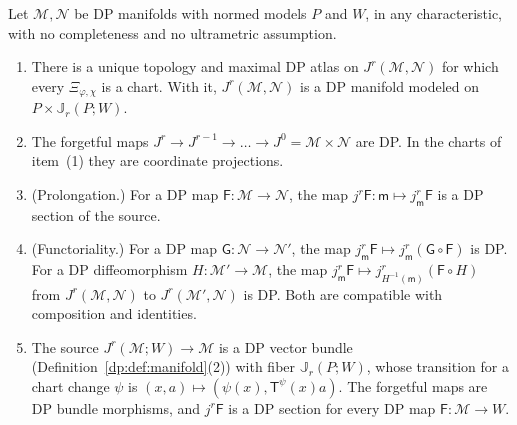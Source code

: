 \begin{theorem}\label{dp:thm:dp-jets}
Let $\mathcal M,\mathcal N$ be DP manifolds with normed models $P$ and $W$, in any characteristic, with no completeness and no ultrametric assumption.
\begin{enumerate}
\item There is a unique topology and maximal DP atlas on $J^r(\mathcal M,\mathcal N)$ for which every $\Xi_{\varphi,\chi}$ is a chart. With it, $J^r(\mathcal M,\mathcal N)$ is a DP manifold modeled on $P\times\mathbb J_r(P;W)$.
\item The forgetful maps $J^r\to J^{r-1}\to\dots\to J^0=\mathcal M\times\mathcal N$ are DP. In the charts of item~\textup{(1)} they are coordinate projections.
\item \textup{(Prolongation.)} For a DP map $\mathsf F\colon\mathcal M\to\mathcal N$, the map $j^r\mathsf F\colon\mathsf m\mapsto j^r_{\mathsf m}\mathsf F$ is a DP section of the source.
\item \textup{(Functoriality.)} For a DP map $\mathsf G\colon\mathcal N\to\mathcal N'$, the map $j^r_{\mathsf m}\mathsf F\mapsto j^r_{\mathsf m}(\mathsf G\circ\mathsf F)$ is DP. For a DP diffeomorphism $H\colon\mathcal M'\to\mathcal M$, the map $j^r_{\mathsf m}\mathsf F\mapsto j^r_{H^{-1}(\mathsf m)}(\mathsf F\circ H)$ from $J^r(\mathcal M,\mathcal N)$ to $J^r(\mathcal M',\mathcal N)$ is DP. Both are compatible with composition and identities.
\item The source $J^r(\mathcal M;W)\to\mathcal M$ is a DP vector bundle (Definition~\ref{dp:def:manifold}(2)) with fiber $\mathbb J_r(P;W)$, whose transition for a chart change $\psi$ is $(x,a)\mapsto(\psi(x),\mathsf T^\psi(x)a)$. The forgetful maps are DP bundle morphisms, and $j^r\mathsf F$ is a DP section for every DP map $\mathsf F\colon\mathcal M\to W$.
\end{enumerate}
\end{theorem}

